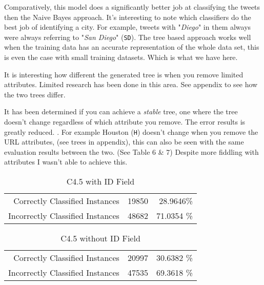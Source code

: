 \documentclass[a4paper]{article}
\begin{document}
Comparatively,  this model does a significantly better job at classifying the tweets then the Naive Bayes approach. It's interesting to note which classifiers do the best job of identifying a city. For example, tweets with "\textit{Diego}" in them always were always referring to "\textit{San Diego}" (\texttt{SD}).
The tree based approach works well when the training data has an accurate representation of the whole data set, this is even the case with small training datasets. Which is what we have here.

It is interesting how different the generated tree is when you remove limited attributes. Limited research has been done in this area. \cite{wu2008top} See appendix to see how the two trees differ.

It has been determined if you can achieve a \textit{stable} tree, one where the tree doesn't change regardless of which attribute you remove. The error results is greatly reduced. \cite{wu2008top}. For example Houston (\texttt{H}) doesn't change when you remove the URL attributes, (see trees in appendix), this can also be seen with the same evaluation results between the two. (See Table 6 \& 7) Despite more fiddling with attributes I wasn't able to achieve this.


\begin{table}[H]
\centering
\caption{C4.5 with ID Field}
\label{my-label}
  \begin{tabular}{rrr}
    Correctly Classified Instances & 19850 &28.9646\% \\
    Incorrectly Classified Instances & 48682 & 71.0354 \% \\
  \end{tabular}
\end{table}

\begin{table}[H]
\centering
\caption{C4.5 without ID Field}
\label{my-label}
  \begin{tabular}{rrr}
    Correctly Classified Instances & 20997 &30.6382 \% \\
    Incorrectly Classified Instances & 47535 &69.3618 \% \\
  \end{tabular}
\end{table}
\end{document}
